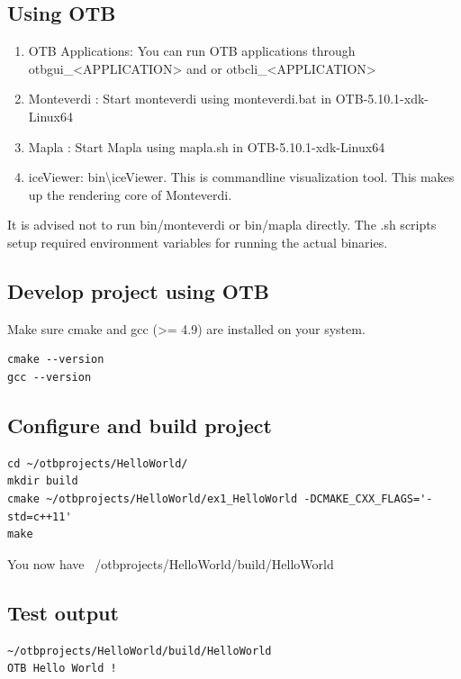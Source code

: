 \documentclass[10pt,a4paper]{article}
\begin{document}
\subsection{Using OTB}
\begin{enumerate}
\item OTB Applications: You can run OTB applications through otbgui\_<APPLICATION> and or otbcli\_<APPLICATION> 
\item Monteverdi : Start monteverdi using monteverdi.bat in OTB-5.10.1-xdk-Linux64
\item Mapla : Start Mapla using mapla.sh in OTB-5.10.1-xdk-Linux64
\item iceViewer: bin{\textbackslash}iceViewer. This is commandline visualization tool. This makes up the rendering core of Monteverdi.
\end{enumerate}
It is advised not to run bin/monteverdi or bin/mapla directly.
\newline
The .sh scripts setup required environment variables for running the actual binaries.
\newline

\subsection{Develop project using OTB}
Make sure cmake and gcc (>= 4.9) are installed on your system.
\newline
\begin{verbatim}
cmake --version
gcc --version
\end{verbatim}

\subsection{Configure and build project}

\begin{verbatim}
cd ~/otbprojects/HelloWorld/
mkdir build
cmake ~/otbprojects/HelloWorld/ex1_HelloWorld -DCMAKE_CXX_FLAGS='-std=c++11'
make
\end{verbatim}
You now have ~/otbprojects/HelloWorld/build/HelloWorld
\newline
\subsection{Test output}

\begin{verbatim}
~/otbprojects/HelloWorld/build/HelloWorld
OTB Hello World !
\end{verbatim}
\end{document}
